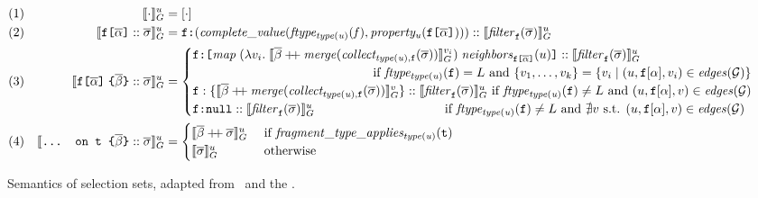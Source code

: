 \begin{figure}[h!]
\small
    \centering
    \begin{align*}
    & (1) & \eval{\cdot}{u} &= [\cdot] \\
    & (2) & \evalu{\fld :: \sset} &= 
        \resp{(\mathit{complete\_value(ftype_{type(u)}(f), property_{u}(\fld))})} :: \evalfilteru{\sset}{\fkey}  \\
    & (3) & \evalu{\nfld{\overline{\beta}} :: \sset} &=
    \begin{cases}
        \resp{\texttt{[} \mathit{map}\; (\lambda v_{i}.\; \eval{\overline{\beta} \mdoubleplus \mathit{merge (collect_{type(u), \fkey} (\sset))}}{v_{i}})\; \mathit{neighbors}_{\fld}(u) \texttt{]}} :: \evalfilteru{\sset}{\fkey} \\  
         \hfill \text{ if } 
            \mathit{ftype_{type(u)}(\fkey)} = L \text{ and } \{v_{1}, \ldots, v_{k}\} = 
        \{v_{i} \mid (u, \fkey[\alpha], v_{i}) \in \mathit{edges}(\graph)\} \\
    \fkey:\{\eval{\overline{\beta} \mdoubleplus \mathit{merge (collect_{type(u), \fkey} (\sset))}}{v}\} ::  \evalfilteru{\sset}{\fkey}  
         \hfill \text{ if } 
        \mathit{ftype_{type(u)}(\fkey)}  \neq L \text{ and } (u, \fkey[\alpha], v) \in \mathit{edges}(\graph) \\
    \resp{\nval} :: \evalfilteru{\sset}{\fkey} 
    \qquad \qquad \qquad \qquad \qquad
  \text{ if } \mathit{ftype_{type(u)}(\fkey)}  \neq L  \text{ and } \nexists v \text{ s.t. }  (u, \fkey[\alpha], v) \in \mathit{edges}(\graph) \\
    \end{cases}\\
    & (4) & \evalu{\ifrag{t}{\overline{\beta}} :: \sset} &= 
    \begin{cases}
    \evalu{\overline{\beta} \mdoubleplus \sset} 
     & \text{ if }\mathit{fragment\_type\_applies_{type(u)}(\texttt{t})}\\
    \evalu{\sset} 
    & \text{ otherwise}
    \end{cases}
    \end{align*}
    \caption{Semantics of \gql selection sets, adapted from~\cite{gqlph} and the \spec. 
    \newline {\footnotesize 
}}
\end{figure}
